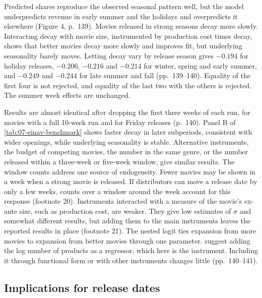 Predicted shares reproduce the observed seasonal pattern well, but the model underpredicts revenue in early summer
and the holidays and overpredicts it elsewhere (Figure 4, p.~139). Movies released in strong seasons decay more
slowly. Interacting decay with movie size, instrumented by production cost times decay, shows that better movies
decay more slowly and improves fit, but underlying seasonality barely moves. Letting decay vary by release season
gives $-0.194$ for holiday releases, $-0.206$, $-0.216$ and $-0.214$ for winter, spring and early summer, and
$-0.249$ and $-0.244$ for late summer and fall (pp.~139--140). Equality of the first four is not rejected, and
equality of the last two with the others is rejected. The summer week effects are unchanged.

Results are almost identical after dropping the first three weeks of each run, for movies with a full 10-week run
and for Friday releases (p.~140). Panel B of \cref{tab:07-einav-benchmark} shows faster decay in later
subperiods, consistent with wider openings, while underlying seasonality is stable. Alternative instruments, the
budget of competing movies, the number in the same genre, or the number released within a three-week or five-week
window, give similar results. The window counts address one source of endogeneity. Fewer movies may be shown in a week
when a strong movie is released. If distributors can move a release date by only a few weeks, counts over a window
around the week account for this response (footnote 20). Instruments
interacted with a measure of the movie's ex-ante size, such as production cost, are weaker. They give low estimates
of $\sigma$ and somewhat different results, but adding them to the main instruments leaves the reported results in
place (footnote 21). The nested logit ties expansion from more movies to expansion from better movies
through one parameter. \citet{AckerbergRysman2005} suggest adding the log number of products as a regressor, which
here is the instrument. Including it through functional form or with other instruments changes little
(pp.~140--141).

\subsection{Implications for release dates}\label{sec:07-einav-timing}

